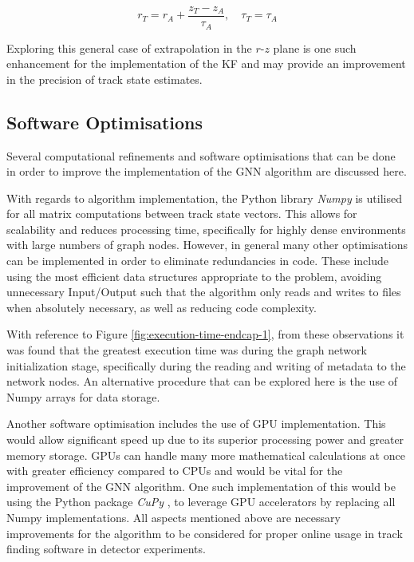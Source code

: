 \begin{equation}
    r_T = r_A + \frac{z_T - z_A}{\tau_A}, \quad \tau_T = \tau_A
    \label{eqn:extrapolation-improvement-2}
\end{equation}


Exploring this general case of extrapolation in the $r$-$z$ plane is one such enhancement for the implementation of the KF and may provide an improvement in the precision of track state estimates.







\subsection{Software Optimisations}

Several computational refinements and software optimisations that can be done in order to improve the implementation of the GNN algorithm are discussed here.

With regards to algorithm implementation, the Python library \textit{Numpy} \cite{harris2020array} is utilised for all matrix computations between track state vectors. This allows for scalability and reduces processing time, specifically for highly dense environments with large numbers of graph nodes. However, in general many other optimisations can be implemented in order to eliminate redundancies in code. These include using the most efficient data structures appropriate to the problem, avoiding unnecessary Input/Output such that the algorithm only reads and writes to files when absolutely necessary, as well as reducing code complexity.

With reference to Figure \ref{fig:execution-time-endcap-1}, from these observations it was found that the greatest execution time was during the graph network initialization stage, specifically during the reading and writing of metadata to the network nodes. An alternative procedure that can be explored here is the use of Numpy arrays for data storage.

Another software optimisation includes the use of GPU implementation. This would allow significant speed up due to its superior processing power and greater memory storage. GPUs can handle many more mathematical calculations at once with greater efficiency compared to CPUs and would be vital for the improvement of the GNN algorithm. One such implementation of this would be using the Python package \textit{CuPy} \cite{cupy_learningsys2017}, to leverage GPU accelerators by replacing all Numpy implementations. All aspects mentioned above are necessary improvements for the algorithm to be considered for proper online usage in track finding software in detector experiments.







